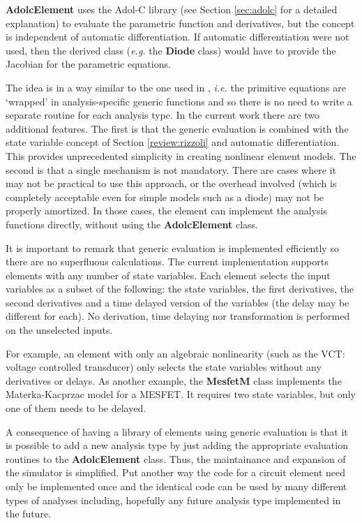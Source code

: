 {\bf AdolcElement} uses the Adol-C library (see Section
\ref{sec:adolc} for a detailed explanation) to evaluate the parametric
function and derivatives, but the concept is independent of automatic
differentiation. If automatic differentiation were not used, then the
derived class (\emph{e.g.} the {\bf Diode} class) would have to
provide the Jacobian for the parametric equations.

The idea is in a way similar to the one used in \cite{aplac2},
\emph{i.e.} the primitive equations are `wrapped' in analysis-specific
generic functions and so there is no need to write a separate routine
for each analysis type. In the current work there are two additional
features. The first is that the generic evaluation is combined with
the state variable concept of Section \ref{review:rizzoli} and
automatic differentiation. This provides unprecedented simplicity in
creating nonlinear element models. The second is that a single
mechanism is not mandatory. There are cases where it may not be
practical to use this approach, or the overhead involved (which is
completely acceptable even for simple models such as a diode) may not
be properly amortized. In those cases, the element can implement the
analysis functions directly, without using the {\bf AdolcElement}
class.

It is important to remark that generic evaluation is implemented
efficiently so there are no superfluous calculations. The current
implementation supports elements with any number of state
variables. Each element selects the input variables as a subset of the
following: the state variables, the first derivatives, the second
derivatives and a time delayed version of the variables (the delay may
be different for each). No derivation, time delaying nor
transformation is performed on the unselected inputs.

For example, an element with only an algebraic nonlinearity (such as
the VCT: voltage controlled transducer) only selects the state
variables without any derivatives or delays. As another example, the
{\bf MesfetM} class implements the Materka-Kacprzac model for a
MESFET. It requires two state variables, but only one of them needs to
be delayed.

A consequence of having a library of elements using generic evaluation
is that it is possible to add a new analysis type by just adding the
appropriate evaluation routines to the {\bf AdolcElement} class. Thus,
the maintainance and expansion of the simulator is simplified. Put
another way the code for a circuit element need only be implemented
once and the identical code can be used by many different types of
analyses including, hopefully any future analysis type implemented
in the future.

